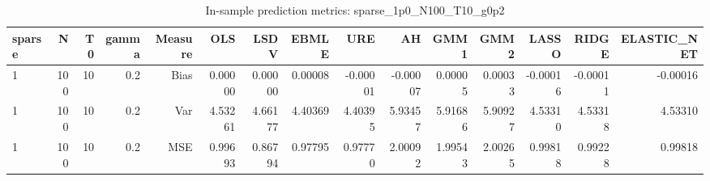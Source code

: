\begin{table}[!htbp]\centering
\caption{In-sample prediction metrics: sparse_1p0_N100_T10_g0p2}
\label{tab:table2_sparse_1p0_N100_T10_g0p2}
\begin{tabular}{lrrrrrrrrrrrrrr}
\hline
sparse & N & T0 & gamma & Measure & OLS & LSDV & EBMLE & URE & AH & GMM1 & GMM2 & LASSO & RIDGE & ELASTIC_NET \\
\hline
1 & 100 & 10 & 0.2 & Bias & 0.00000 & 0.00000 & 0.00008 & -0.00001 & -0.00007 & 0.00005 & 0.00033 & -0.00016 & -0.00011 & -0.00016 \\
1 & 100 & 10 & 0.2 & Var & 4.53261 & 4.66177 & 4.40369 & 4.40395 & 5.93457 & 5.91686 & 5.90927 & 4.53310 & 4.53318 & 4.53310 \\
1 & 100 & 10 & 0.2 & MSE & 0.99693 & 0.86794 & 0.97795 & 0.97770 & 2.00092 & 1.99543 & 2.00265 & 0.99818 & 0.99228 & 0.99818 \\
\hline
\end{tabular}
\end{table}

